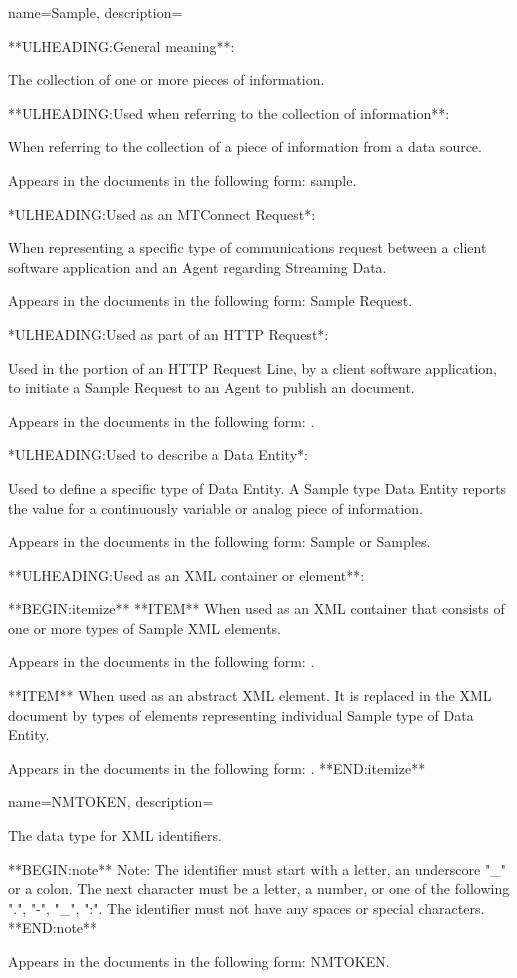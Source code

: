 {
    name={Sample},
	description={
	**ULHEADING:General meaning**:

	The collection of one or more pieces of information.  

	**ULHEADING:Used when referring to the collection of information**:

	When referring to the collection of a piece of information from a data source.

	Appears in the documents in the following form: sample.

	*ULHEADING:Used as an \gls{MTConnect Request}*:

	When representing a specific type of communications request between a client software application and an \gls{Agent} regarding \gls{Streaming Data}.  

	Appears in the documents in the following form: \gls{Sample Request}.

	*ULHEADING:Used as part of an \gls{HTTP Request}*:

	Used in the  portion of an \gls{HTTP Request Line}, by a client software application, to initiate a \gls{Sample Request} to an \gls{Agent} to publish an  document.

	Appears in the documents in the following form: .

	*ULHEADING:Used to describe a \gls{Data Entity}*:

	Used to define a specific type of \gls{Data Entity}.  A \gls{Sample} type \gls{Data Entity} reports the value for a continuously variable or analog piece of information.

	Appears in the documents in the following form: \gls{Sample} or \gls{Samples}.

	**ULHEADING:Used as an XML container or element**:

    **BEGIN:itemize**
	**ITEM** When used as an XML container that consists of one or more types of Sample XML elements.

	Appears in the documents in the following form: .

	**ITEM** When used as an abstract XML element.  It is replaced in the XML document by types of  elements representing individual \gls{Sample} type of \gls{Data Entity}.

	Appears in the documents in the following form: .
    **END:itemize**
}
}

{
    name={NMTOKEN},
	description={
	The data type for XML identifiers.

	**BEGIN:note**
	Note: The identifier must start with a letter, an underscore "_" or a colon.  The next character must be a letter, a number, or one of the following ".", "-", "_", ":".  The identifier must not have any spaces or special characters.
	**END:note**

	Appears in the documents in the following form: \gls{NMTOKEN}.
}
}

